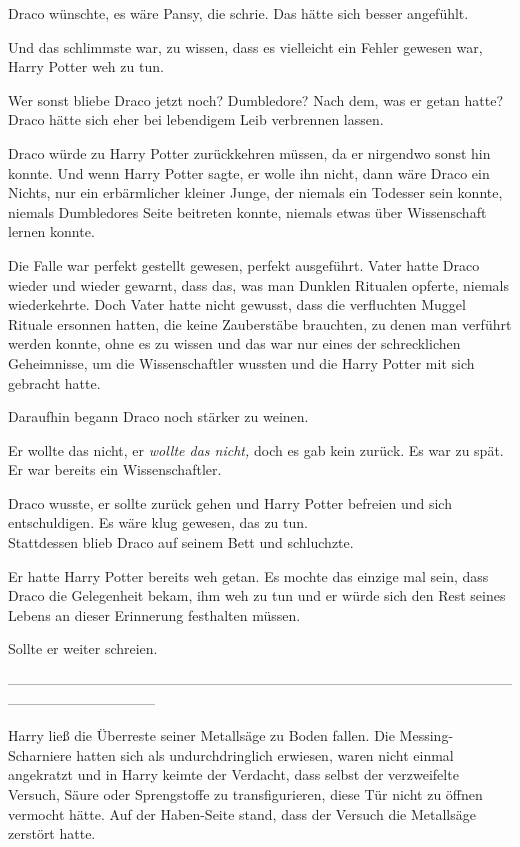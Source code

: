 {Draco wünschte, es wäre Pansy, die schrie. Das hätte sich besser angefühlt.

Und das schlimmste war, zu wissen, dass es vielleicht ein Fehler gewesen war, Harry Potter weh zu tun.

Wer sonst bliebe Draco jetzt noch? Dumbledore? Nach dem, was er getan hatte? Draco hätte sich eher bei lebendigem Leib verbrennen lassen.

Draco würde zu Harry Potter zurückkehren müssen, da er nirgendwo sonst hin konnte. Und wenn Harry Potter sagte, er wolle ihn nicht, dann wäre Draco ein Nichts, nur ein erbärmlicher kleiner Junge, der niemals ein Todesser sein konnte, niemals Dumbledores Seite beitreten konnte, niemals etwas über Wissenschaft lernen konnte.

Die Falle war perfekt gestellt gewesen, perfekt ausgeführt. Vater hatte Draco wieder und wieder gewarnt, dass das, was man Dunklen Ritualen opferte, niemals wiederkehrte. Doch Vater hatte nicht gewusst, dass die verfluchten Muggel Rituale ersonnen hatten, die keine Zauberstäbe brauchten, zu denen man verführt werden konnte, ohne es zu wissen und das war nur eines der schrecklichen Geheimnisse, um die Wissenschaftler wussten und die Harry Potter mit sich gebracht hatte.

Daraufhin begann Draco noch stärker zu weinen.

Er wollte das nicht, er \emph{wollte das nicht,} doch es gab kein zurück. Es war zu spät. Er war bereits ein Wissenschaftler.

Draco wusste, er sollte zurück gehen und Harry Potter befreien und sich entschuldigen. Es wäre klug gewesen, das zu tun.\\ Stattdessen blieb Draco auf seinem Bett und schluchzte.

Er hatte Harry Potter bereits weh getan. Es mochte das einzige mal sein, dass Draco die Gelegenheit bekam, ihm weh zu tun und er würde sich den Rest seines Lebens an dieser Erinnerung festhalten müssen.

Sollte er weiter schreien.

--------------------------------------------------------------------------------------------------------------------------------------------

Harry ließ die Überreste seiner Metallsäge zu Boden fallen. Die Messing-Scharniere hatten sich als undurchdringlich erwiesen, waren nicht einmal angekratzt und in Harry keimte der Verdacht, dass selbst der verzweifelte Versuch, Säure oder Sprengstoffe zu transfigurieren, diese Tür nicht zu öffnen vermocht hätte. Auf der Haben-Seite stand, dass der Versuch die Metallsäge zerstört hatte.

}
